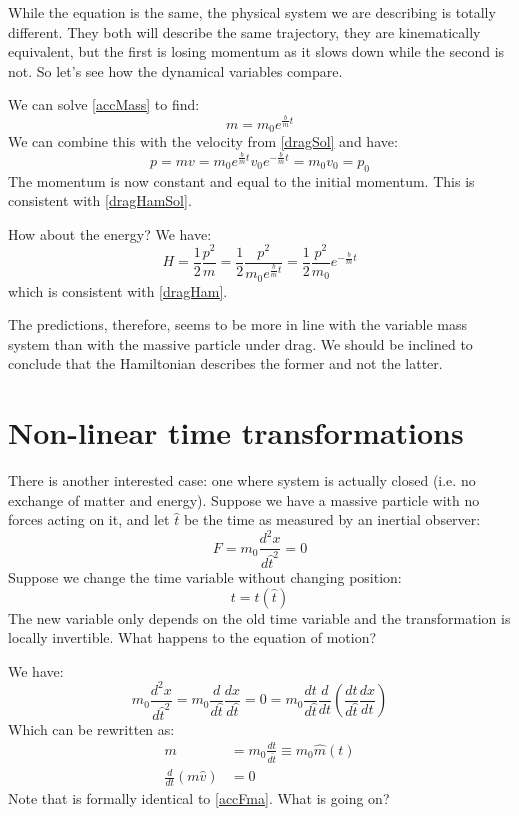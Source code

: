\documentclass[aps,pra,10pt,floatfix,nofootinbib]{revtex4-1}
\theoremstyle{definition}
\begin{document}
While the equation is the same, the physical system we are describing is totally different. They both will describe the same trajectory, they are kinematically equivalent, but the first is losing momentum as it slows down while the second is not. So let's see how the dynamical variables compare.

We can solve \eqref{accMass} to find:
\begin{equation}
\label{accMassSol}
m = m_0 e^{\frac{b}{m} t}
\end{equation}
We can combine this with the velocity from \eqref{dragSol} and have:
\begin{equation}
p = m v = m_0 e^{\frac{b}{m} t} v_0 e^{-\frac{b}{m}t} = m_0 v_0 = p_0
\end{equation}
The momentum is now constant and equal to the initial momentum. This is consistent with \eqref{dragHamSol}.

How about the energy? We have:
\begin{equation}
H = \frac{1}{2} \frac{p^2}{m} = \frac{1}{2} \frac{p^2}{m_0 e^{\frac{b}{m} t}} = \frac{1}{2} \frac{p^2}{m_0} e^{-\frac{b}{m} t}
\end{equation}
which is consistent with \eqref{dragHam}.

The predictions, therefore, seems to be more in line with the variable mass system than with the massive particle under drag. We should be inclined to conclude that the Hamiltonian describes the former and not the latter.

\section{Non-linear time transformations}

There is another interested case: one where system is actually closed (i.e. no exchange of matter and energy). Suppose we have a massive particle with no forces acting on it, and let $\hat{t}$ be the time as measured by an inertial observer:
\begin{equation*}
F=m_0\frac{d^2x}{d\hat{t}^2}=0
\end{equation*}
Suppose we change the time variable without changing position:
\begin{equation}
t=t(\hat{t})
\end{equation}
The new variable only depends on the old time variable and the transformation is locally invertible. What happens to the equation of motion?

We have:
\begin{equation*}
m_0\frac{d^2x}{d\hat{t}^2}= m_0 \frac{d}{d\hat{t}} \frac{dx}{d\hat{t}} =0 = m_0 \frac{dt}{d\hat{t}}\frac{d}{dt} (\frac{dt}{d\hat{t}}\frac{dx}{dt})
\end{equation*}
Which can be rewritten as:
\begin{equation}
\begin{aligned}
m &= m_0 \frac{dt}{d\hat{t}} \equiv m_0 \hat{m}(t) \\
\frac{d}{dt} (m\hat{v}) &= 0
\end{aligned}
\label{transMass}
\end{equation}
Note that is formally identical to \eqref{accFma}. What is going on?
\end{document}
